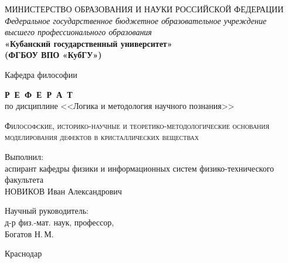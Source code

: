 \documentclass[a4paper, 14pt, titlepage]{extarticle}
\author{\theauthor,\\ кафедра физики и информационных систем КубГУ}
\title{\thetitle}
\date{\today{} \currenttime}
\newcommand{\thetitle}{Философские, историко-научные и теоретико-методологические основания
  моделирования дефектов в кристаллических веществах}
\begin{document}

  \thispagestyle{empty}
  \begin{center}
  \begin{spacing}{1.0}
  {\small МИНИСТЕРСТВО ОБРАЗОВАНИЯ И НАУКИ РОССИЙСКОЙ ФЕДЕРАЦИИ\\
  \textit{Федеральное государственное бюджетное образовательное учреждение\\
  высшего профессионального образования}}\\
  \textbf{\large«Кубанский государственный университет»\\
  (ФГБОУ ВПО «КубГУ»)}

  \vspace {5mm}

  Кафедра философии

  \vspace {4cm}

  \textbf{\large Р~Е~Ф~Е~Р~А~Т}\\
  по дисциплине <<Логика и методология научного познания>>

  \vspace {0.5cm}

  { \scshape \thetitle }

  \vspace {1.5cm}

  \hfill\begin{minipage}{0.63\textwidth}
    Выполнил:\\
    аспирант кафедры физики и информационных систем
    физико-технического факультета\\
    НОВИКОВ Иван Александрович
    \vspace{1cm}

    Научный руководитель:\\
    д-р физ.-мат. наук, профессор,\\
    Богатов Н.\,М.
  \end{minipage}

  \vfill

  Краснодар \the\year
  \end{spacing}
  \end{center}


    \clearpage
    \tableofcontents


  \label{sec:intro}
\end{document}
